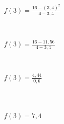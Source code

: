 \begin{align}
f(3)=\frac{16-(3,4)^2}{4-3,4}\\\\\\\\\\\\\\\\
f(3)=\frac{16-11,56}{4-3,4}\\\\\\\\\\\\\\\\
f(3)=\frac{4,44}{0,6}\\\\\\\\\\\\\\\\\\\\
f(3)=7,4
\end{align}